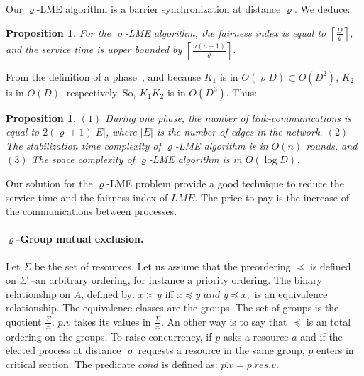 \documentclass[11pt]{article}
\newtheorem{proposition}[theorem]{Proposition}
\begin{document}
Our $\varrho$-LME algorithm is a barrier synchronization at distance $\varrho$. We deduce:


\begin{proposition}
For the $\varrho$-LME algorithm, the fairness index is  equal to $\left\lceil \frac{D}{\varrho }\right\rceil $, and 
the service time is upper bounded by $\left\lceil \frac{n\left( n-1\right) }{\varrho }\right\rceil $.
\end{proposition}

From the definition of a phase~\cite{BPV04b}, and because $K_{1}$ is in $O\left( \varrho D\right) \subset O\left( D^{2}\right)$,  
$K_{2}$ is in $O\left( D\right)$, respectively. So, $K_{1}K_{2}$ is in $O\left(
D^{3}\right)$. Thus:	

\begin{proposition}
$(1)$ During one phase, the number of link-communications is equal to $2\left( \varrho
+1\right) \left| E\right| $, where $\left| E\right| $ is the number of edges
in the network.
$(2)$ The stabilization time complexity of $\varrho$-LME algorithm is in $O\left( n\right)$ rounds, and
$(3)$ The space complexity of $\varrho$-LME algorithm is in $O\left( \log D\right) $.
\end{proposition}

Our solution for the $\varrho$-LME problem provide a good technique to reduce the service time 
and the fairness index of $LME$. The price to pay is the increase of the communications between
processes.

\paragraph{$\varrho$-Group mutual exclusion.} 

Let $\Sigma $ be the set of resources. Let us assume 
that the preordering $\preceq $ is
defined on $\Sigma $ --an arbitrary ordering, for instance a priority ordering. The
binary relationship on $A$, defined by: $x\asymp y$ iff $x\preceq y$ $and$ $
y\preceq x,$ is an equivalence relationship. The equivalence classes are the
groups. The set of groups is the quotient $\frac{\Sigma }{\asymp }$. 
$p.v$ takes its values in $\frac{\Sigma }{\asymp }$. An other way is to say that $\preceq $ is an total ordering on the groups.
To raise concurrency, if $p$ asks a resource $a$ and if the elected process at distance $\varrho $ requests a resource in the same group, $p$  enters in critical section.
The predicate $cond$ is defined as: $\overline{p.v}= p.res.v$.  
\end{document}
